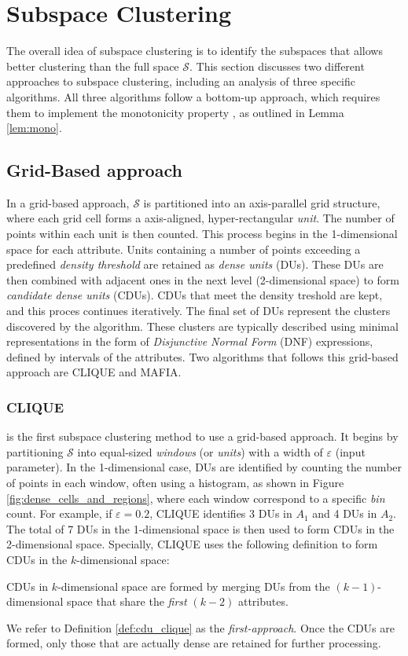 \section{Subspace Clustering}
The overall idea of subspace clustering is to identify the subspaces that allows better clustering than the full space $\mathcal{S}$. This section discusses two different approaches to subspace clustering, including an analysis of three specific algorithms. All three algorithms follow a bottom-up approach, which requires them to implement the monotonicity property \cite[p.~1:11]{kriegel-2009}, as outlined in Lemma \ref{lem:mono}.

\subsection{Grid-Based approach}
In a grid-based approach, $\mathcal{S}$ is partitioned into an axis-parallel grid structure, where each grid cell forms a axis-aligned, hyper-rectangular \textit{unit}. The number of points within each unit is then counted. This process begins in the 1-dimensional space for each attribute. Units containing a number of points exceeding a predefined \textit{density threshold} are retained as \textit{dense units} (DUs). These DUs are then combined with adjacent ones in the next level (2-dimensional space) to form \textit{candidate dense units} (CDUs). CDUs that meet the density treshold are kept, and this proces continues iteratively. The final set of DUs represent the clusters discovered by the algorithm. These clusters are typically described using minimal representations in the form of \textit{Disjunctive Normal Form} (DNF) expressions, defined by intervals of the attributes. Two algorithms that follows this grid-based approach are CLIQUE and MAFIA.

\subsubsection{CLIQUE}
is the first subspace clustering method to use a grid-based approach. It begins by partitioning $\mathcal{S}$ into equal-sized \textit{windows} (or \textit{units}) with a width of $\varepsilon$ (input parameter). In the 1-dimensional case, DUs are identified by counting the number of points in each window, often using a histogram, as shown in Figure \ref{fig:dense_cells_and_regions}, where each window correspond to a specific \textit{bin} count. For example, if $\varepsilon = 0.2$, CLIQUE identifies 3 DUs in $A_1$ and 4 DUs in $A_2$. The total of 7 DUs in the 1-dimensional space is then used to form CDUs in the 2-dimensional space. Specially, CLIQUE uses the following definition to form CDUs in the $k$-dimensional space:
\begin{definition}\label{def:cdu_clique}
    CDUs in $k$-dimensional space are formed by merging DUs from the $(k-1)$-dimensional space that share the \textit{first} $(k-2)$ attributes.
\end{definition}
We refer to Definition \ref{def:cdu_clique} as the \textit{first-approach}. Once the CDUs are formed, only those that are actually dense are retained for further processing.

